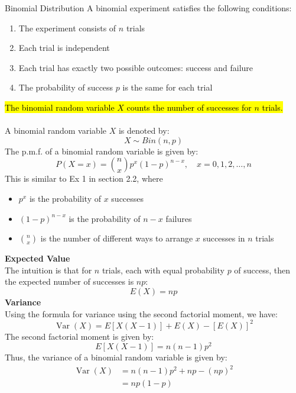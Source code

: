 ﻿\documentclass[12pt]{article}
\begin{document}
\begin{definition}{Binomial Distribution}
    A binomial experiment satisfies the following conditions:
    \begin{enumerate}
        \item The experiment consists of $n$ trials
        \item Each trial is independent
        \item Each trial has exactly two possible outcomes: success and failure
        \item The probability of success $p$ is the same for each trial
    \end{enumerate}
    \hl{The binomial random variable $X$ counts the number of successes for $n$ trials.}\\\\
    A binomial random variable $X$ is denoted by:
    \[X \sim Bin(n,p)\]
    The p.m.f. of a binomial random variable is given by:
    \[\boxed{P(X=x) = \binom{n}{x} p^x (1-p)^{n-x}, \quad x=0,1,2,\ldots,n}\]
    This is similar to Ex 1 in section 2.2, where
    \begin{itemize}
        \item $p^x$ is the probability of $x$ successes
        \item $(1-p)^{n-x}$ is the probability of $n-x$ failures
        \item $\binom{n}{x}$ is the number of different ways to arrange $x$ successes in $n$ trials
    \end{itemize}
    \textbf{Expected Value}\\
    The intuition is that for $n$ trials, each with equal probability $p$ of success, then the expected number of successes is $np$:
    \[E(X) = np\]
    \textbf{Variance}\\
    Using the formula for variance using the second factorial moment, we have:
    \[\operatorname{Var}(X) = E[X(X-1)] + E(X) - [E(X)]^2\]
    The second factorial moment is given by:
    \[E[X(X-1)]=n(n-1)p^2\]
    Thus, the variance of a binomial random variable is given by:
    \[
\begin{aligned}
\operatorname{Var}(X)
&=n(n-1)p^2+np-(np)^2\\
&=\boxed{np(1-p)}
\end{aligned}
\]
\end{definition}
\end{document}
